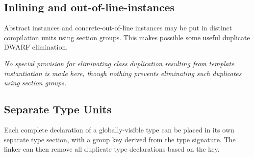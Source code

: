\subsection{Inlining and out-of-line-instances}
\label{app:inliningandoutoflineinstances}

Abstract instances
and concrete-out-of-line instances may be
put in distinct compilation units using 
section groups. 
This
makes possible some useful duplicate DWARF elimination.

\textit{No special provision for eliminating class duplication
resulting from template instantiation is made here, though
nothing prevents eliminating such duplicates using section
groups.}


\subsection{Separate Type Units}
\label{app:separatetypeunits}

Each complete declaration of a globally-visible type can be
placed in its own separate type section, with a group key
derived from the type signature. The linker can then remove
all duplicate type declarations based on the key.

